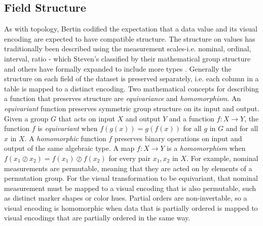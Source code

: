 \documentclass[10pt,journal,compsoc]{IEEEtran}
\theoremstyle{definition}
\theoremstyle{remark}
\begin{document}
\subsection{Field Structure} 
\label{sec:related-work:equivariance}
As with topology, Bertin \cite{bertinSemiologyGraphicsDiagrams2011} codified the expectation that a data value and its visual encoding are expected to have compatible structure. The structure on values has traditionally been described  using the measurement scales-i.e. nominal, ordinal, interval, ratio - which Steven's classified by their mathematical group structure\cite{stevensTheoryScalesMeasurement1946a} and others have formally expanded to include more types \cite{leaFormalizationMeasurementScale, thomasMathematizationNotMeasurement2014}. Generally the structure on each field of the dataset is preserved separately, i.e. each column in a table is mapped to a distinct encoding. Two mathematical concepts for describing a function that preserves structure are \textit{equivariance} and \textit{homomorphism}. An \textit{equivariant} function preserves symmetric group structure on its input and output. Given a group $G$ that acts on input $X$ and output $Y$ and a function $f: X \rightarrow Y$, the function $f$ is \textit{equivariant} when $f(g(x)) = g(f(x))$ for all $g$ in $G$ and for all $x$ in $X$\cite{nlab:equivariant}. A \textit{homomorphic} function $f$ preserves binary operations on input and output of the same algebraic type. A map $f: X \rightarrow Y$ is a \textit{homomorphism} when  $f(x_1 \oslash x_2) = f(x_1) \oslash f(x_2)$ for every pair $x_1, x_2$ in $X$\cite{grimaldiDiscreteCombinatorialMathematics2006}. For example, nominal measurements are permutable, meaning that they are acted on by elements of a permutation group. For the visual transformation to be equivariant, that nominal measurement must be mapped to a visual encoding that is also permutable, such as distinct marker shapes or color hues. Partial orders are non-invertable, so a visual encoding is homomorphic when data that is partially ordered is mapped to visual encodings that are partially ordered in the same way.
\end{document}
